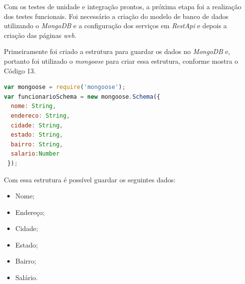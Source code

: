\par Com os testes de unidade e integração prontos, a próxima etapa foi a realização dos testes funcionais. Foi necessário a criação do modelo de banco de dados utilizando o \textit{MongoDB} e a configuração dos serviços em \textit{RestApi} e depois a criação das páginas \textit{web}.

\newpage
\par Primeiramente foi criado a estrutura para guardar os dados no \textit{MongoDB} e, portanto foi utilizado o \textit{mongoose} para criar essa estrutura, conforme mostra o Código 13.



\begin{lstlisting}[language=JavaScript, caption={[Estrutura Documento MongoDB.]{Estrutura Documento MongoDB.  \textbf{Fonte:} Elaborado pelos autores.}}]
var mongoose = require('mongoose');
var funcionarioSchema = new mongoose.Schema({
  nome: String,
  endereco: String,
  cidade: String,
  estado: String,
  bairro: String,
  salario:Number
 });

\end{lstlisting}

\par Com essa estrutura é possível guardar os seguintes dados:
 \begin{itemize}
  \item Nome;
  \item Endereço;
  \item Cidade;
  \item Estado;
  \item Bairro;
   \item Salário.
 \end{itemize}

